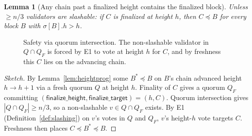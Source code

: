\documentclass{article}
\newcommand{\height}{\mathsf{height}}
\newcommand{\finalizeHeight}{\mathsf{finalize\_height}}
\newcommand{\finalizeTarget}{\mathsf{finalize\_target}}
\theoremstyle{plain}
\newtheorem{lemma}[theorem]{Lemma}
\theoremstyle{definition}
\theoremstyle{remark}
\begin{document}
\begin{lemma}[Any chain past a finalized height contains the finalized block]\label{lem:mainsafety}
Unless $\geq n/3$ validators are slashable: if $C$ is finalized at height $h$, then $C \preceq B$ for every block $B$ with $\sigma[B].h > h$.
\end{lemma}

\begin{figure}[H]
\centering
{}
\caption{Safety via quorum intersection. The non-slashable validator in $Q \cap Q_F$ is forced by E1 to vote at height $h$ for $C$, and by freshness this $C$ lies on the advancing chain.}\label{fig:safety}
\end{figure}

\begin{proof}[Sketch]
By Lemma~\ref{lem:heightprog} some $B^* \preceq B$ on $B$'s chain advanced height $h \to h+1$ via a fresh quorum $Q$ at height $h$. Finality of $C$ gives a quorum $Q_F$ committing $(\finalizeHeight, \finalizeTarget) = (h, C)$. Quorum intersection gives $|Q \cap Q_F| \geq n/3$, so a non-slashable $v \in Q \cap Q_F$ exists. By E1 (Definition~\ref{def:slashing}) on $v$'s votes in $Q$ and $Q_F$, $v$'s height-$h$ vote targets $C$. Freshness then places $C \preceq B^* \preceq B$.
\end{proof}
\end{document}
